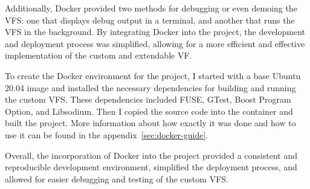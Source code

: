 Additionally, Docker provided two methods for debugging or even demoing the VFS: one that displays debug output in a terminal, and another that runs the VFS in the background.
By integrating Docker into the project, the development and deployment process was simplified, allowing for a more efficient and effective implementation of the custom and extendable VF\@.

To create the Docker environment for the project, I started with a base Ubuntu 20.04 image and installed the necessary dependencies for building and running the custom VFS\@.
These dependencies included FUSE, GTest, Boost Program Option, and Libsodium.
Then I copied the source code into the container and built the project.
More information about how exactly it was done and how to use it can be found in the appendix~\ref{sec:docker-guide}.

Overall, the incorporation of Docker into the project provided a consistent and reproducible development environment, simplified the deployment process, and allowed for easier debugging and testing of the custom VFS.